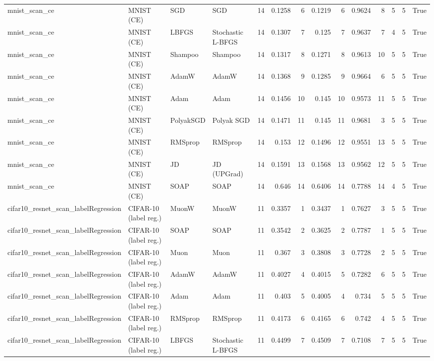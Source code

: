 \begin{tabular}{llllrrrrrrrrrr}
mnist\_scan\_ce & MNIST (CE) & SGD & SGD & 14 & 0.1258 & 6 & 0.1219 & 6 & 0.9624 & 8 & 5 & 5 & True \\
mnist\_scan\_ce & MNIST (CE) & LBFGS & Stochastic L-BFGS & 14 & 0.1307 & 7 & 0.125 & 7 & 0.9637 & 7 & 4 & 5 & True \\
mnist\_scan\_ce & MNIST (CE) & Shampoo & Shampoo & 14 & 0.1317 & 8 & 0.1271 & 8 & 0.9613 & 10 & 5 & 5 & True \\
mnist\_scan\_ce & MNIST (CE) & AdamW & AdamW & 14 & 0.1368 & 9 & 0.1285 & 9 & 0.9664 & 6 & 5 & 5 & True \\
mnist\_scan\_ce & MNIST (CE) & Adam & Adam & 14 & 0.1456 & 10 & 0.145 & 10 & 0.9573 & 11 & 5 & 5 & True \\
mnist\_scan\_ce & MNIST (CE) & PolyakSGD & Polyak SGD & 14 & 0.1471 & 11 & 0.145 & 11 & 0.9681 & 3 & 5 & 5 & True \\
mnist\_scan\_ce & MNIST (CE) & RMSprop & RMSprop & 14 & 0.153 & 12 & 0.1496 & 12 & 0.9551 & 13 & 5 & 5 & True \\
mnist\_scan\_ce & MNIST (CE) & JD & JD (UPGrad) & 14 & 0.1591 & 13 & 0.1568 & 13 & 0.9562 & 12 & 5 & 5 & True \\
mnist\_scan\_ce & MNIST (CE) & SOAP & SOAP & 14 & 0.646 & 14 & 0.6406 & 14 & 0.7788 & 14 & 4 & 5 & True \\
cifar10\_resnet\_scan\_labelRegression & CIFAR-10 (label reg.) & MuonW & MuonW & 11 & 0.3357 & 1 & 0.3437 & 1 & 0.7627 & 3 & 5 & 5 & True \\
cifar10\_resnet\_scan\_labelRegression & CIFAR-10 (label reg.) & SOAP & SOAP & 11 & 0.3542 & 2 & 0.3625 & 2 & 0.7787 & 1 & 5 & 5 & True \\
cifar10\_resnet\_scan\_labelRegression & CIFAR-10 (label reg.) & Muon & Muon & 11 & 0.367 & 3 & 0.3808 & 3 & 0.7728 & 2 & 5 & 5 & True \\
cifar10\_resnet\_scan\_labelRegression & CIFAR-10 (label reg.) & AdamW & AdamW & 11 & 0.4027 & 4 & 0.4015 & 5 & 0.7282 & 6 & 5 & 5 & True \\
cifar10\_resnet\_scan\_labelRegression & CIFAR-10 (label reg.) & Adam & Adam & 11 & 0.403 & 5 & 0.4005 & 4 & 0.734 & 5 & 5 & 5 & True \\
cifar10\_resnet\_scan\_labelRegression & CIFAR-10 (label reg.) & RMSprop & RMSprop & 11 & 0.4173 & 6 & 0.4165 & 6 & 0.742 & 4 & 5 & 5 & True \\
cifar10\_resnet\_scan\_labelRegression & CIFAR-10 (label reg.) & LBFGS & Stochastic L-BFGS & 11 & 0.4499 & 7 & 0.4509 & 7 & 0.7108 & 7 & 5 & 5 & True \\

\end{tabular}
